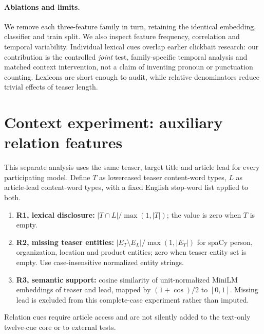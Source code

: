 \documentclass[11pt]{article}
\begin{document}
\paragraph{Ablations and limits.} We remove each three-feature family in turn, retaining the identical embedding, classifier and train split. We also inspect feature frequency, correlation and temporal variability. Individual lexical cues overlap earlier clickbait research: our contribution is the controlled \emph{joint} test, family-specific temporal analysis and matched context intervention, not a claim of inventing pronoun or punctuation counting. Lexicons are short enough to audit, while relative denominators reduce trivial effects of teaser length.

\section{Context experiment: auxiliary relation features}\label{app:context}
This separate analysis uses the same teaser, target title and article lead for every participating model. Define $T$ as lowercased teaser content-word types, $L$ as article-lead content-word types, with a fixed English stop-word list applied to both.
\begin{enumerate}[leftmargin=*,itemsep=2pt]
\item \textbf{R1, lexical disclosure:} $|T\cap L|/\max(1,|T|)$; the value is zero when $T$ is empty.
\item \textbf{R2, missing teaser entities:} $|E_T\setminus E_L|/\max(1,|E_T|)$ for spaCy person, organization, location and product entities; zero when teaser entity set is empty. Use case-insensitive normalized entity strings.
\item \textbf{R3, semantic support:} cosine similarity of unit-normalized MiniLM embeddings of teaser and lead, mapped by $(1+\cos)/2$ to $[0,1]$. Missing lead is excluded from this complete-case experiment rather than imputed.
\end{enumerate}
Relation cues require article access and are not silently added to the text-only twelve-cue core or to external tests.
\end{document}
